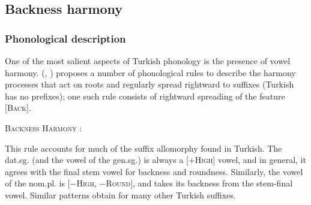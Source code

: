 \subsection{Backness harmony}

\subsubsection{Phonological description}

One of the most salient aspects of Turkish phonology is the presence of vowel harmony. \citeauthor{Lees1966a} (\citeyear[][284]{Lees1966b}, \citeyear[][35]{Lees1966a}) proposes a number of phonological rules to describe the harmony processes that act on roots and regularly spread rightward to suffixes (Turkish has no prefixes); one such rule consists of rightward spreading of the feature [\textsc{Back}].

\ex \textsc{Backness Harmony} \citep[e.g.,][229]{Clements1982}: \\
\xe


This rule accounts for much of the suffix allomorphy found in Turkish. The dat.sg. (and the vowel of the gen.sg.) is always a [$+$\textsc{High}] vowel, and in general, it agrees with the final stem vowel for backness and roundness. Similarly, the vowel of the nom.pl. is [$-$\textsc{High}, $-$\textsc{Round}], and takes its backness from the stem-final vowel. Similar patterns obtain for many other Turkish suffixes.

